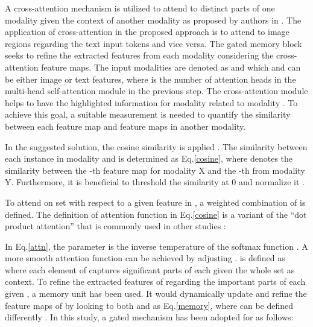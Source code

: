 \documentclass{midl}
\begin{document}
A cross-attention mechanism is utilized to attend to distinct parts of one modality given the context of another modality as proposed by authors in \cite{chen2020imram, wei2020multi}. The application of cross-attention in the proposed approach is to attend to image regions regarding the text input tokens and vice versa. The gated memory block seeks to refine the extracted features from each modality considering the cross-attention feature maps. The input modalities are denoted as  and  which  and  can be either image or text features, where  is the number of attention heads in the multi-head self-attention module in the previous step. The cross-attention module helps to have the highlighted information for modality  related to modality . To achieve this goal, a suitable measurement is needed to quantify the similarity between each feature map and feature maps in another modality.

In the suggested solution, the cosine similarity is applied \cite{ji2019saliency, jia2021scaling,lee2018stacked}. The similarity between each instance in modality  and  is determined as Eq.\ref{cosine}, where  denotes the similarity between the -th feature map for modality X and the -th from modality Y. 
Furthermore, it is beneficial to threshold the similarity at 0 and normalize it \cite{karpathy2014deep,lee2018stacked}.







To attend on set  with respect to a given feature  in , a weighted combination of  is defined. The definition of attention function in Eq.\ref{cosine} is a variant of the ``dot product attention'' that is commonly used in other studies  \cite{luong2015effective}:



 
In Eq.\ref{attn}, the parameter  is the inverse temperature of the softmax function  \cite{chorowski2015attention}. A more smooth attention function can be achieved by adjusting .  is defined as  where each element of  captures significant  parts of each  given the whole  set as context. To refine the extracted features of  regarding the important parts of each  given , a memory unit has been used. It would dynamically update and refine the feature maps of  by looking to both  and  as Eq.\ref{memory}, where  can be defined differently \cite{kalra2020learning,weston2014memory,burtsev2020memory}. In this study, a gated mechanism has been adopted for  as follows:
\end{document}
